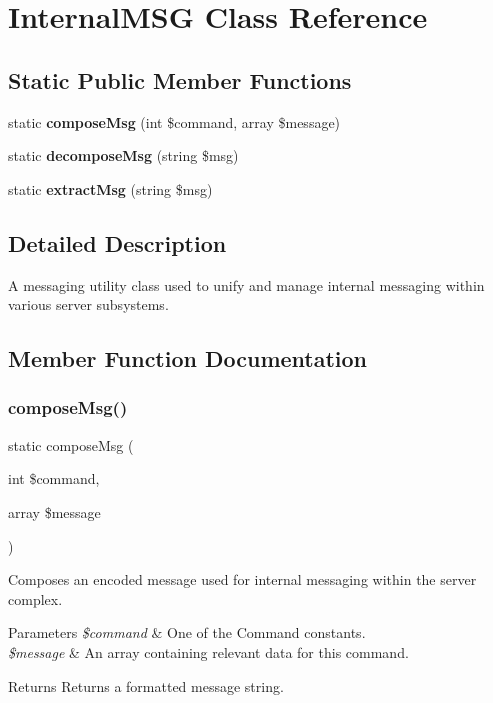 \section{Internal\+M\+SG Class Reference}
\label{class_internal_m_s_g}
\subsection*{Static Public Member Functions}
\begin{DoxyCompactItemize}
\item 
static \textbf{ compose\+Msg} (int \$command, array \$message)
\item 
static \textbf{ decompose\+Msg} (string \$msg)
\item 
static \textbf{ extract\+Msg} (string \$msg)
\end{DoxyCompactItemize}


\subsection{Detailed Description}
A messaging utility class used to unify and manage internal messaging within various server subsystems. 

\subsection{Member Function Documentation}
\mbox{\label{class_internal_m_s_g_ae3b91a7baffc1bef8eaeb4a5bcca65f0}} 
\subsubsection{compose\+Msg()}
{\footnotesize\ttfamily static compose\+Msg (\begin{DoxyParamCaption}\item[{int}]{\$command,  }\item[{array}]{\$message }\end{DoxyParamCaption})\hspace{0.3cm}{\ttfamily [static]}}

Composes an encoded message used for internal messaging within the server complex. 
\begin{DoxyParams}{Parameters}
{\em \$command} & One of the Command constants. \\
\hline
{\em \$message} & An array containing relevant data for this command. \\
\hline
\end{DoxyParams}
\begin{DoxyReturn}{Returns}
Returns a formatted message string. 
\end{DoxyReturn}

